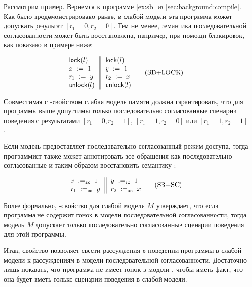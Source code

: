 Рассмотрим пример. 
Вернемся к программе \ref{ex:sb} из \cref{sec:background:compile}.
Как было продемонстрировано ранее, в слабой модели 
эта программа может допускать результат ${[r_1=0, r_2=0]}$.
Тем не менее, семантика последовательной согласованности
может быть восстановлена, например, при помощи блокировок, 
как показано в примере ниже:

\begin{equation*}
\inarrII{
   \lockInst{l}         \\
   \writeInst{}{x}{1}   \\
   \readInst{}{r_1}{y}  \\
   \unlockInst{l}       \\
}{
   \lockInst{l}         \\
   \writeInst{}{y}{1}   \\
   \readInst{}{r_2}{x}  \\
   \unlockInst{l}       \\
}
\tag{SB+LOCK}\label{ex:sb-lock}
\end{equation*}

Совместимая с \DRF-свойством слабая модель памяти должна гарантировать, 
что для программы выше допустимы только 
последовательно согласованные сценарии поведения с результатами
${[r_1=0, r_2=1]}$, ${[r_1=1,r_2=0]}$ или ${[r_1=1,r_2=1]}$.

Если модель предоставляет последовательно согласованный 
режим доступа, тогда программист также может 
аннотировать все обращения как последовательно согласованные
и таким образом восстановить семантику \SC:
 
\begin{equation*}
\inarrII{
   \writeInst{\sco}{x}{1}   \\
   \readInst{\sco}{r_1}{y}  \\
}{
   \writeInst{\sco}{y}{1}   \\
   \readInst{\sco}{r_2}{x}  \\
}
\tag{SB+SC}\label{ex:sb-sc}
\end{equation*}

Более формально, \DRF-свойство для слабой модели $M$
утверждает, что если программа не содержит гонок в модели 
последовательной согласованности, тогда модель $M$
допускает только последовательно согласованные 
сценарии поведения для этой программы.

Итак, свойство \DRF позволяет свести рассуждения о поведении программы 
в слабой модели к рассуждениям в модели последовательной согласованности.
Достаточно лишь показать, что программа не имеет гонок 
в модели \SC, чтобы иметь факт, что она будет иметь только \SC 
сценарии поведения в слабой модели. 

